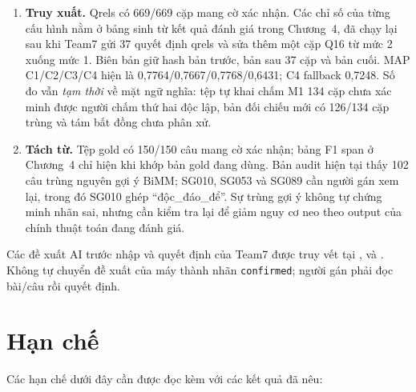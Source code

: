 \begin{enumerate}
  \item \textbf{Truy xuất.} Qrels có 669/669 cặp mang cờ xác nhận. Các chỉ số
        của từng cấu hình nằm ở bảng sinh từ kết quả đánh giá trong Chương~4,
        đã chạy lại sau khi Team7 gửi 37 quyết định qrels và sửa thêm một cặp
        Q16 từ mức 2 xuống mức 1. Biên bản giữ hash bản trước, bản sau 37 cặp
        và bản cuối. MAP C1/C2/C3/C4 hiện là 0,7764/0,7667/0,7768/0,6431;
        C4 fallback 0,7248. Số đo vẫn \emph{tạm thời} về mặt ngữ nghĩa: tệp
        tự khai chấm M1 134 cặp chưa xác minh được người chấm thứ hai độc lập,
        bản đối chiếu mới có 126/134 cặp trùng và tám bất đồng chưa phân xử.
  \item \textbf{Tách từ.} Tệp gold có 150/150 câu mang cờ xác nhận; bảng F1 span
        ở Chương~4 chỉ hiện khi khớp bản gold đang dùng. Bản audit hiện tại thấy
        102 câu trùng nguyên gợi ý BiMM; SG010, SG053 và SG089 cần người gán
        xem lại, trong đó SG010 ghép ``độc\_đáo\_để''. Sự trùng gợi ý
        không tự chứng minh nhãn sai, nhưng cần kiểm tra lại để giảm nguy cơ
        neo theo output của chính thuật toán đang đánh giá.
\end{enumerate}

Các đề xuất AI trước nhập và quyết định của Team7 được truy vết tại
,  và
. Không tự chuyển đề xuất của
máy thành nhãn \texttt{confirmed}; người gán phải đọc bài/câu rồi quyết định.

\section{Hạn chế}

Các hạn chế dưới đây cần được đọc kèm với các kết quả đã nêu:

